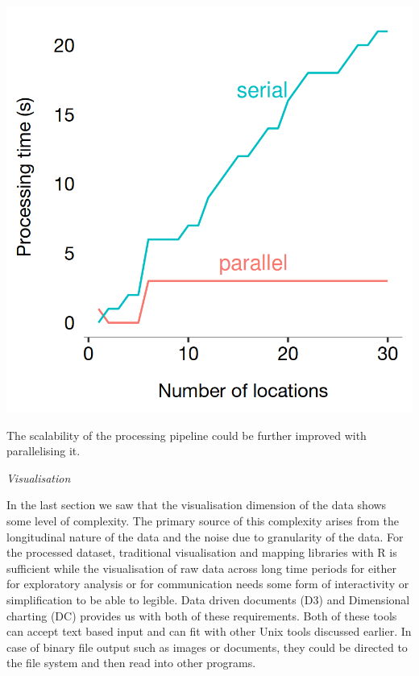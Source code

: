 \begin{marginfigure}[-1cm]
  \includegraphics[trim={0 0 0 0},clip]{images/processing-times-parallel.png}
  \caption{The scalability of the processing pipeline could be further improved with parallelising it.}
  \label{figure:toolkit:time:parallel}
\end{marginfigure}


\vspace{1.5em}\noindent\textit{Visualisation}\vspace{0.5em}

In the last section we saw that the visualisation dimension of the data shows some level of complexity.
The primary source of this complexity arises from the longitudinal nature of the data and the noise due to granularity of the data.
For the processed dataset, traditional visualisation and mapping libraries with R is sufficient while the visualisation of raw data across long time periods for either for exploratory analysis or for communication needs some form of interactivity or simplification to be able to legible.
Data driven documents (D3) \cite[-0.75cm]{stanford2011d3}and Dimensional charting (DC) provides us with both of these requirements.
Both of these tools can accept text based input and can fit with other Unix tools discussed earlier.
In case of binary file output such as images or documents, they could be directed to the file system and then read into other programs.

